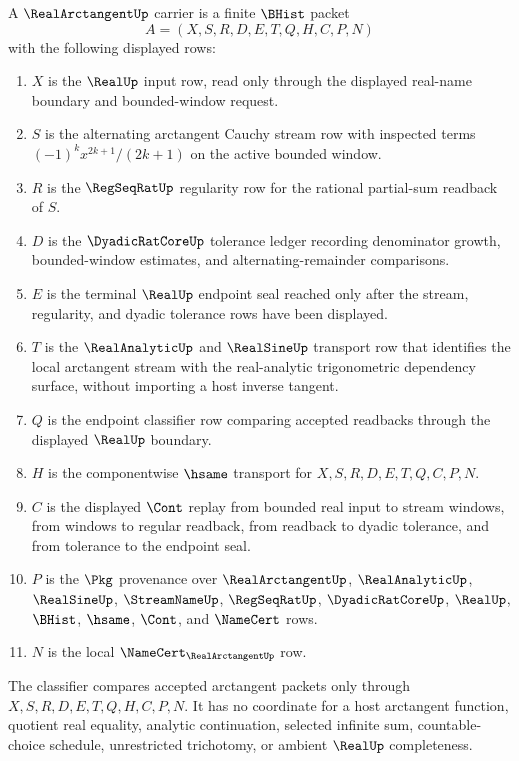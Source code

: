 \begin{definition}
\label{def:real-arctangent-cauchy-carrier}
A $\RealArctangentUp$ carrier is a finite $\BHist$ packet
$$
A=(X,S,R,D,E,T,Q,H,C,P,N)
$$
with the following displayed rows:
\begin{enumerate}
\item $X$ is the $\RealUp$ input row, read only through the displayed real-name boundary and bounded-window request.
\item $S$ is the alternating arctangent Cauchy stream row with inspected terms $(-1)^k x^{2k+1}/(2k+1)$ on the active bounded window.
\item $R$ is the $\RegSeqRatUp$ regularity row for the rational partial-sum readback of $S$.
\item $D$ is the $\DyadicRatCoreUp$ tolerance ledger recording denominator growth, bounded-window estimates, and alternating-remainder comparisons.
\item $E$ is the terminal $\RealUp$ endpoint seal reached only after the stream, regularity, and dyadic tolerance rows have been displayed.
\item $T$ is the $\RealAnalyticUp$ and $\RealSineUp$ transport row that identifies the local arctangent stream with the real-analytic trigonometric dependency surface, without importing a host inverse tangent.
\item $Q$ is the endpoint classifier row comparing accepted readbacks through the displayed $\RealUp$ boundary.
\item $H$ is the componentwise $\hsame$ transport for $X,S,R,D,E,T,Q,C,P,N$.
\item $C$ is the displayed $\Cont$ replay from bounded real input to stream windows, from windows to regular readback, from readback to dyadic tolerance, and from tolerance to the endpoint seal.
\item $P$ is the $\Pkg$ provenance over $\RealArctangentUp$, $\RealAnalyticUp$, $\RealSineUp$, $\StreamNameUp$, $\RegSeqRatUp$, $\DyadicRatCoreUp$, $\RealUp$, $\BHist$, $\hsame$, $\Cont$, and $\NameCert$ rows.
\item $N$ is the local $\NameCert_{\RealArctangentUp}$ row.
\end{enumerate}
The classifier compares accepted arctangent packets only through $X,S,R,D,E,T,Q,H,C,P,N$. It has no coordinate for a host arctangent function, quotient real equality, analytic continuation, selected infinite sum, countable-choice schedule, unrestricted trichotomy, or ambient $\RealUp$ completeness.
\end{definition}


